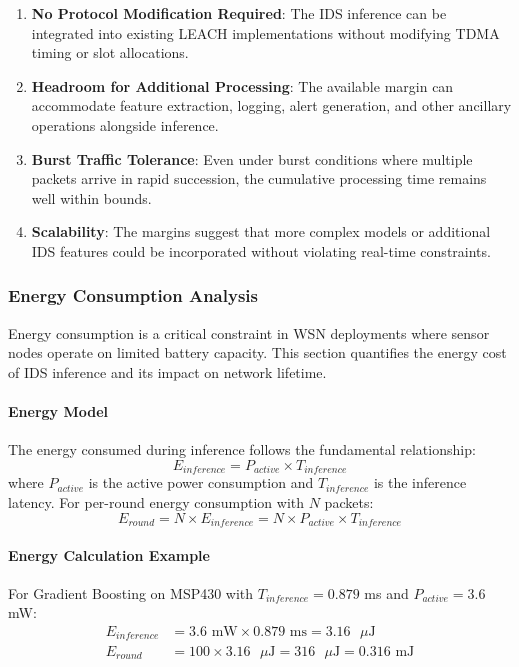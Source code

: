 \begin{enumerate}
    \item \textbf{No Protocol Modification Required}: The IDS inference can be integrated into existing LEACH implementations without modifying TDMA timing or slot allocations.
    
    \item \textbf{Headroom for Additional Processing}: The available margin can accommodate feature extraction, logging, alert generation, and other ancillary operations alongside inference.
    
    \item \textbf{Burst Traffic Tolerance}: Even under burst conditions where multiple packets arrive in rapid succession, the cumulative processing time remains well within bounds.
    
    \item \textbf{Scalability}: The margins suggest that more complex models or additional IDS features could be incorporated without violating real-time constraints.
\end{enumerate}

\subsubsection{Energy Consumption Analysis}

Energy consumption is a critical constraint in WSN deployments where sensor nodes operate on limited battery capacity. This section quantifies the energy cost of IDS inference and its impact on network lifetime.

\paragraph{Energy Model}
The energy consumed during inference follows the fundamental relationship:
\begin{equation}
    E_{inference} = P_{active} \times T_{inference}
\end{equation}
where $P_{active}$ is the active power consumption and $T_{inference}$ is the inference latency. For per-round energy consumption with $N$ packets:
\begin{equation}
    E_{round} = N \times E_{inference} = N \times P_{active} \times T_{inference}
\end{equation}

\paragraph{Energy Calculation Example}
For Gradient Boosting on MSP430 with $T_{inference} = 0.879$ ms and $P_{active} = 3.6$ mW:
\begin{align}
    E_{inference} &= 3.6 \text{ mW} \times 0.879 \text{ ms} = 3.16 \text{ }\mu\text{J} \\
    E_{round} &= 100 \times 3.16 \text{ }\mu\text{J} = 316 \text{ }\mu\text{J} = 0.316 \text{ mJ}
\end{align}


